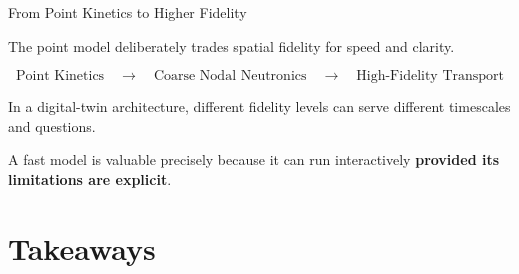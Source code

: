 \documentclass[aspectratio=169]{beamer}
\begin{document}

\begin{frame}{From Point Kinetics to Higher Fidelity}

    The point model deliberately trades spatial fidelity for speed and clarity.

    \vspace{1em}

    \[
        \boxed{\text{Point Kinetics}}
        \quad\longrightarrow\quad
        \boxed{\text{Coarse Nodal Neutronics}}
        \quad\longrightarrow\quad
        \boxed{\text{High-Fidelity Transport}}
    \]

    \vspace{1.5em}

    In a digital-twin architecture, different fidelity levels can serve
    different timescales and questions.

    \vspace{1em}

    A fast model is valuable precisely because it can run interactively
    \textbf{provided its limitations are explicit}.

\end{frame}



\section{Takeaways}


\end{document}

